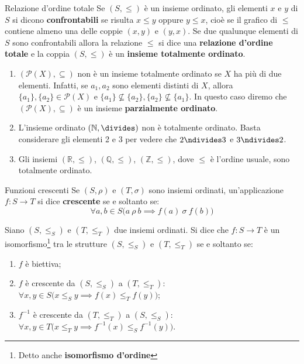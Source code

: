 \begin{defbox}{Relazione d'ordine totale}
	Se $(S,\leq)$ è un insieme ordinato, gli elementi $x$ e $y$ di $S$ si dicono \textbf{confrontabili} se risulta $x \leq y$ oppure $y \leq x$, cioè se il grafico di $\leq$ contiene almeno una delle coppie $(x,y)$ e $(y,x)$. Se due qualunque elementi di $S$ sono confrontabili allora la relazione $\leq$ si dice una \textbf{relazione d'ordine totale} e la coppia $(S,\leq)$ è un \textbf{insieme totalmente ordinato}.
\end{defbox}

\begin{example}
\begin{enumerate}
		\item $(\mathcal{P}(X), \subseteq)$ non è un insieme totalmente ordinato se $X$ ha più di due elementi. Infatti, se $a_{1}, a_{2}$ sono elementi distinti di $X$, allora $\{a_{1}\}, \{a_{2}\} \in \mathcal{P}(X)$ e $\{a_{1}\} \nsubseteq \{a_{2}\}, \{a_{2}\}\nsubseteq \{a_{1}\}$. In questo caso diremo che $(\mathcal{P}(X),\subseteq)$ è un insieme \textbf{parzialmente ordinato}.
		\item L'insieme ordinato $(\mathbb{N}, \divides)$ non è totalmente ordinato. Basta considerare gli elementi 2 e 3 per vedere che $2 \ndivides 3$ e $3 \ndivides 2$.
		\item Gli insiemi $(\mathbb{R},\leq)$, $(\mathbb{Q},\leq)$, $(\mathbb{Z},\leq)$, dove $\leq$ è l'ordine usuale, sono totalmente ordinato.
\end{enumerate}
\end{example}

\begin{defbox}{Funzioni crescenti}
	Se $(S, \rho)$ e $(T,\sigma)$ sono insiemi ordinati, un'applicazione $f: S \rightarrow T$ si dice \textbf{crescente} se e soltanto se:
	\begin{equation}
		\forall a,b \in S \bigl(a \ \rho \ b \implies f(a) \ \sigma \ f(b) \bigr)
	\end{equation}
\end{defbox}

\begin{teorbox}\label{thm:iso_ordinati}
	Siano $(S,\leq_{S})$ e $(T, \leq_{T})$ due insiemi ordinati. Si dice che $f: S \rightarrow T$ è un isomorfismo\footnote{Detto anche \textbf{isomorfismo d'ordine}} tra le strutture $(S,\leq_{S})$ e $(T,\leq_{T})$ se e soltanto se:
	\begin{enumerate}
		\item $f$ è biettiva;
		\item $f$ è crescente da $(S,\leq_{S})$ a $(T, \leq_{T})$: $\forall x,y \in S \bigl(x \leq_{S} y \implies f(x) \leq_{T} f(y) \bigr)$;
		\item $f^{-1}$ è crescente da $(T, \leq_{T})$ a $(S,\leq_{S})$: $\forall x,y \in T \bigl( x \leq_{T} y \implies f^{-1}(x) \leq_{S} f^{-1}(y) \bigr)$.
	\end{enumerate}
\end{teorbox}

